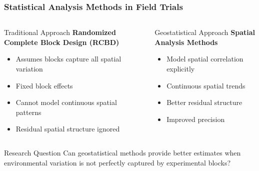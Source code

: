 

\begin{frame}
    \frametitle{Statistical Analysis Methods in Field Trials}
    
    \begin{columns}[T]
        \begin{column}{0.5\textwidth}
            \begin{block}{Traditional Approach}
                \textbf{Randomized Complete Block Design (RCBD)}
                \begin{itemize}
                    \item Assumes blocks capture all spatial variation
                    \item Fixed block effects
                    \item Cannot model continuous spatial patterns
                    \item Residual spatial structure ignored
                \end{itemize}
            \end{block}
        \end{column}
        
        \begin{column}{0.5\textwidth}
            \begin{block}{Geostatistical Approach}
                \textbf{Spatial Analysis Methods}
                \begin{itemize}
                    \item Model spatial correlation explicitly
                    \item Continuous spatial trends
                    \item Better residual structure
                    \item Improved precision
                \end{itemize}
            \end{block}
        \end{column}
    \end{columns}
    
    \vspace{1em}
    
    \begin{alertblock}{Research Question}
        Can geostatistical methods provide better estimates when environmental variation is not perfectly captured by experimental blocks?
    \end{alertblock}
\end{frame}

